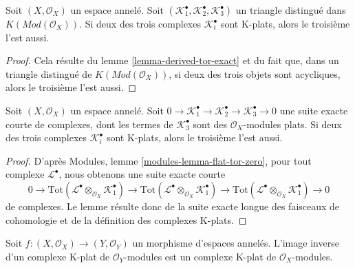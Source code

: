 \begin{lemma}

\label{lemma-K-flat-two-out-of-three}
Soit $(X, \mathcal{O}_X)$ un espace annelé. Soit $(\mathcal{K}_1^\bullet, \mathcal{K}_2^\bullet, \mathcal{K}_3^\bullet)$ un triangle distingué dans $K(\textit{Mod}(\mathcal{O}_X))$. Si deux des trois complexes $\mathcal{K}_i^\bullet$ sont K-plats, alors le troisième l'est aussi.
\end{lemma}

\begin{proof}
Cela résulte du lemme \ref{lemma-derived-tor-exact} et du fait que, dans un triangle distingué de $K(\textit{Mod}(\mathcal{O}_X))$, si deux des trois objets sont acycliques, alors le troisième l'est aussi.
\end{proof}

\begin{lemma}

\label{lemma-K-flat-two-out-of-three-ses}
Soit $(X, \mathcal{O}_X)$ un espace annelé. Soit $0 \to \mathcal{K}_1^\bullet \to \mathcal{K}_2^\bullet \to
\mathcal{K}_3^\bullet \to 0$ une suite exacte courte de complexes, dont les termes de $\mathcal{K}_3^\bullet$ sont des $\mathcal{O}_X$-modules plats. Si deux des trois complexes $\mathcal{K}_i^\bullet$ sont K-plats, alors le troisième l'est aussi.
\end{lemma}

\begin{proof}
D'après Modules, lemme \ref{modules-lemma-flat-tor-zero}, pour tout complexe $\mathcal{L}^\bullet$, nous obtenons une suite exacte courte $$
0 \to
\text{Tot}(\mathcal{L}^\bullet \otimes_{\mathcal{O}_X} \mathcal{K}_1^\bullet)
\to
\text{Tot}(\mathcal{L}^\bullet \otimes_{\mathcal{O}_X} \mathcal{K}_1^\bullet)
\to
\text{Tot}(\mathcal{L}^\bullet \otimes_{\mathcal{O}_X} \mathcal{K}_1^\bullet)
\to 0
$$ de complexes. Le lemme résulte donc de la suite exacte longue des faisceaux de cohomologie et de la définition des complexes K-plats.
\end{proof}

\begin{lemma}

\label{lemma-pullback-K-flat}

Soit $f : (X, \mathcal{O}_X) \to (Y, \mathcal{O}_Y)$ un morphisme d'espaces annelés. L'image inverse d'un complexe K-plat de $\mathcal{O}_Y$-modules est un complexe K-plat de $\mathcal{O}_X$-modules.

\end{lemma}

